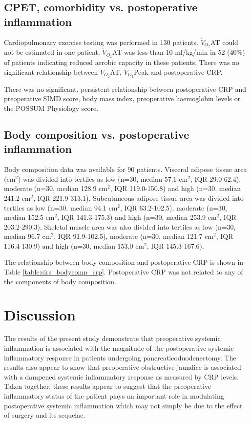 \subsection{CPET, comorbidity vs. postoperative inflammation}
Cardiopulmonary exercise testing was performed in 130 patients. 
$\dot{V}_{O_2}$AT could not be estimated in one patient.
$\dot{V}_{O_2}$AT was less than 10 ml/kg/min in 52 (40\%) of patients indicating reduced aerobic capacity in these patients.
There was no significant relationship between $\dot{V}_{O_2}$AT, $\dot{V}_{O_2}$Peak and postoperative CRP.%

There was no significant, persistent relationship between postoperative CRP and preoperative SIMD score, body mass index, preoperative haemoglobin levels or the POSSUM Physiology score. 

\subsection{Body composition vs. postoperative inflammation}
Body composition data was available for 90 patients.
Visceral adipose tissue area (cm$^2$) was divided into tertiles as low (n=30, median 57.1 cm$^2$, IQR 29.0-62.4), moderate (n=30, median 128.9 cm$^2$, IQR 119.0-150.8) and high (n=30, median 241.2 cm$^2$, IQR 221.9-313.1). 
Subcutaneous adipose tissue area was divided into tertiles as low (n=30, median 94.1 cm$^2$, IQR 63.2-102.5), moderate (n=30, median 152.5 cm$^2$, IQR 141.3-175.3) and high (n=30, median 253.9 cm$^2$, IQR 203.2-290.3).
Skeletal muscle area was also divided into tertiles as low (n=30, median 96.7 cm$^2$, IQR 91.9-102.5), moderate (n=30, median 121.7 cm$^2$, IQR 116.4-130.9) and high (n=30, median 153.0 cm$^2$, IQR 145.3-167.6).

The relationship between body composition and postoperative CRP is shown in Table \ref{table:sirs_bodycomp_crp}.
Postoperative CRP was not related to any of the components of body composition.



\clearpage
\section{Discussion}

The results of the present study demonstrate that preoperative systemic inflammation is associated with the magnitude of the postoperative systemic inflammatory response in patients undergoing pancreaticoduodenectomy. 
The results also appear to show that preoperative obstructive jaundice is associated with a dampened systemic inflammatory response as measured by CRP levels. 
Taken together, these results appear to suggest that the preoperative inflammatory status of the patient plays an important role in modulating postoperative systemic inflammation which may not simply be due to the effect of surgery and its sequelae.

